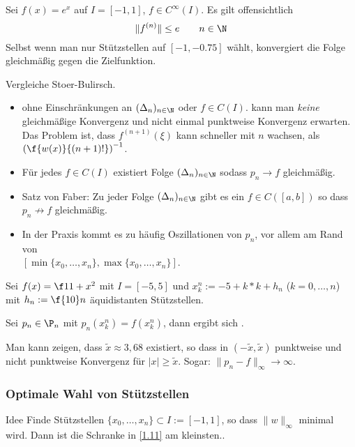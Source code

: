 \documentclass[11pt]{scrartcl}
\begin{document}
\begin{ex*}
	Sei $f(x)=e^x$ auf $I=[-1,1]$, $f\in C^\infty(I)$.
	Es gilt offensichtlich
	\[
		\|f^{(n)}\| \le e \qquad n\in \N
	\]
	Selbst wenn man nur Stützstellen auf $[-1,-0.75]$ wählt, konvergiert die Folge gleichmäßig gegen die Zielfunktion.
\end{ex*}

\begin{note}
	Vergleiche Stoer-Bulirsch.
	\begin{itemize}
		\item
			ohne Einschränkungen an $(\Delta_n)_{n\in \N}$ oder $f\in C(I)$. kann man \emph{keine} gleichmäßige Konvergenz und nicht einmal punktweise Konvergenz erwarten.
			Das Problem ist, dass $f^{(n+1)}(\xi)$ kann schneller mit $n$ wachsen, als $\left(\f {w(x)}{(n+1)!}\right)^{-1}$.	
		\item
			Für jedes $f\in C(I)$ existiert Folge $(\Delta_n)_{n\in \N}$ sodass $p_n\to f$ gleichmäßig.
		\item
			Satz von Faber: Zu jeder Folge $(\Delta_n)_{n\in \N}$ gibt es ein $f\in C([a,b])$ so dass $p_n\not\to f$ gleichmäßig.
		\item
			In der Praxis kommt es zu häufig Oszillationen von $p_n$, vor allem am Rand von\\ $[ \min\{x_0,\dotsc, x_n\},\max\{x_0,\dotsc,x_n\} ]$.
	\end{itemize}
\end{note}

\begin{ex*}[Runge]
	Sei $f(x)= \f 1{1+x^2}$ mit $I=[-5,5]$ und $x_k^n := -5+k*k+h_n$ ($k=0,\dotsc,n$) mit $h_n:= \f {10}n$ äquidistanten Stützstellen.

	Sei $p_n\in \P_n$ mit $p_n(x_k^n) = f(x_k^n)$, dann ergibt sich \fixme[Oszillationen].
	
	Man kann zeigen, dass $\tilde x \approx 3,68$ existiert, so dass in $(-\tilde x,\tilde x)$ punktweise und nicht punktweise Konvergenz für $|x|\ge \tilde x$. Sogar: $\|p_n-f\|_\infty \to \infty$.
\end{ex*}

\subsubsection{Optimale Wahl von Stützstellen}

\begin{seg}{Idee}
Finde Stützstellen $\{x_0,\dotsc,x_n\}\subset I := [-1,1]$, so dass $\|w\|_\infty$ minimal wird.
Dann ist die Schranke in \ref{1.11} am kleinsten..
\end{seg}
\end{document}
